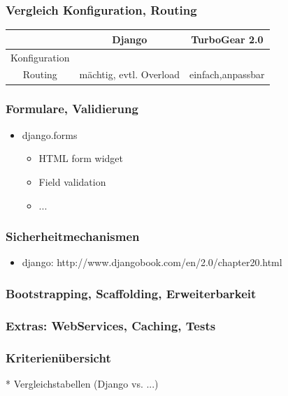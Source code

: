 \documentclass[
    t,
    smaller,
    compress,
]{beamer}
\begin{document}
\begin{frame}
	\frametitle{Vergleich Konfiguration, Routing}
	
	
	\begin{table}[h]
		\begin{tabular}{|c|c|c|}
			\hline
			 & Django & TurboGear 2.0  \\ \hline
		  	Konfiguration &  &  \\ \hline
		  	Routing & \cellcolor{orange} mächtig, evtl. Overload & \cellcolor{green} einfach,anpassbar	   \\ \hline
		 \end{tabular}
	\end{table}

	
\end{frame}

\begin{frame}
  \frametitle{Formulare, Validierung}
  
  \begin{itemize}[<1->]
    \item django.forms
	 \begin{itemize}[<1->]
		\item HTML form widget
		\item Field validation
		\item ...
	\end{itemize}
  \end{itemize}

\end{frame}


\begin{frame}
  \frametitle{Sicherheitmechanismen}
  
  \begin{itemize}[<1->]
    \item django: http://www.djangobook.com/en/2.0/chapter20.html
    \end{itemize}

\end{frame}


\begin{frame}
  \frametitle{Bootstrapping, Scaffolding, Erweiterbarkeit}
\end{frame}


\begin{frame}
  \frametitle{Extras: WebServices, Caching, Tests}
\end{frame}


\begin{frame}
  \frametitle{Kriterienübersicht}
 * Vergleichstabellen (Django vs. ...)
\end{frame}
\end{document}
